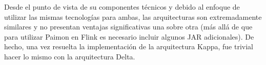 Desde el punto de vista de su componentes técnicos y debido al enfoque de utilizar las mismas tecnologías para ambas, 
las arquitecturas son extremadamente similares y no presentan ventajas significativas una sobre otra 
(más allá de que para utilizar Paimon en Flink es necesario incluir algunos JAR adicionales).
De hecho, una vez resuelta la implementación de la arquitectura Kappa, fue trivial hacer lo mismo con la arquitectura Delta. 

\newpage